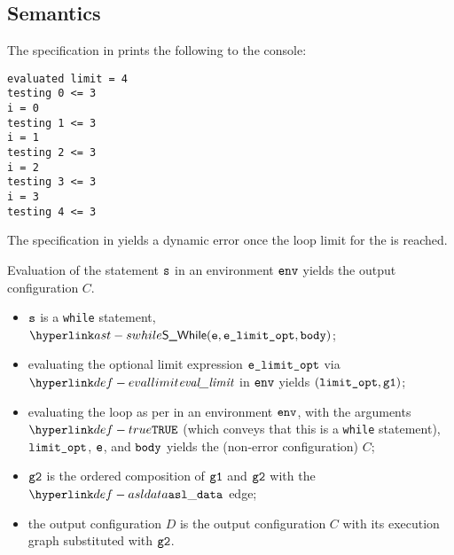 \subsection{Semantics}
The specification in  prints the
following to the console:
\begin{Verbatim}[fontsize=\footnotesize, frame=single]
evaluated limit = 4
testing 0 <= 3
i = 0
testing 1 <= 3
i = 1
testing 2 <= 3
i = 2
testing 3 <= 3
i = 3
testing 4 <= 3
\end{Verbatim}

The specification in  yields a dynamic
error once the loop limit for the \whilestatementterm{} is reached.

\ProseParagraph
Evaluation of the statement $\vs$ in an environment $\env$ yields
the output configuration $C$.
\AllApply
\begin{itemize}
  \item $\vs$ is a \texttt{while} statement, $\SWhile(\ve, \velimitopt, \vbody)$;
  \item evaluating the optional limit expression $\velimitopt$ via $\evallimit$ in $\env$
        yields $(\vlimitopt, \vgone)$\ProseOrError;
  \item evaluating the loop as per  in an environment $\env$,
  with the arguments $\True$ (which conveys that this is a \texttt{while} statement), $\vlimitopt$, $\ve$, and $\vbody$
  yields the (non-error configuration) $C$\ProseOrError;
  \item $\vgtwo$ is the ordered composition of $\vgone$ and $\vgtwo$ with the $\asldata$ edge;
  \item the output configuration $D$ is the output configuration $C$ with its execution graph
        substituted with $\vgtwo$.
\end{itemize}
\FormallyParagraph
\begin{mathpar}
\end{mathpar}


